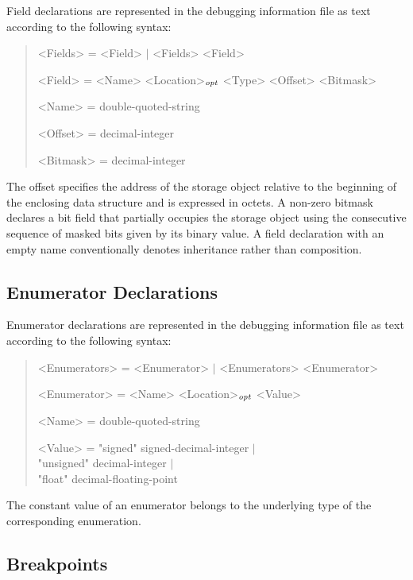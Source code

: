 Field declarations are represented in the debugging information file as text according to the following syntax:

\begin{quote}\begin{grammar}
<Fields> = <Field> $\mid$ <Fields> <Field> \par
<Field> = <Name> <Location>$_\mathit{opt}$ <Type> <Offset> <Bitmask> \par
<Name> = double-quoted-string \par
<Offset> = decimal-integer \par
<Bitmask> = decimal-integer \par
\end{grammar}\end{quote}

The offset specifies the address of the storage object relative to the beginning of the enclosing data structure and is expressed in octets.
A non-zero bitmask declares a bit field that partially occupies the storage object using the consecutive sequence of masked bits given by its binary value.
A field declaration with an empty name conventionally denotes inheritance rather than composition.

\subsection{Enumerator Declarations}

Enumerator declarations are represented in the debugging information file as text according to the following syntax:

\begin{quote}\begin{grammar}
<Enumerators> = <Enumerator> $\mid$ <Enumerators> <Enumerator> \par
<Enumerator> = <Name> <Location>$_\mathit{opt}$ <Value> \par
<Name> = double-quoted-string \par
<Value> = "signed" signed-decimal-integer $\mid$ \\ "unsigned" decimal-integer $\mid$ \\ "float" decimal-floating-point \par
\end{grammar}\end{quote}

The constant value of an enumerator belongs to the underlying type of the corresponding enumeration.

\subsection{Breakpoints}

